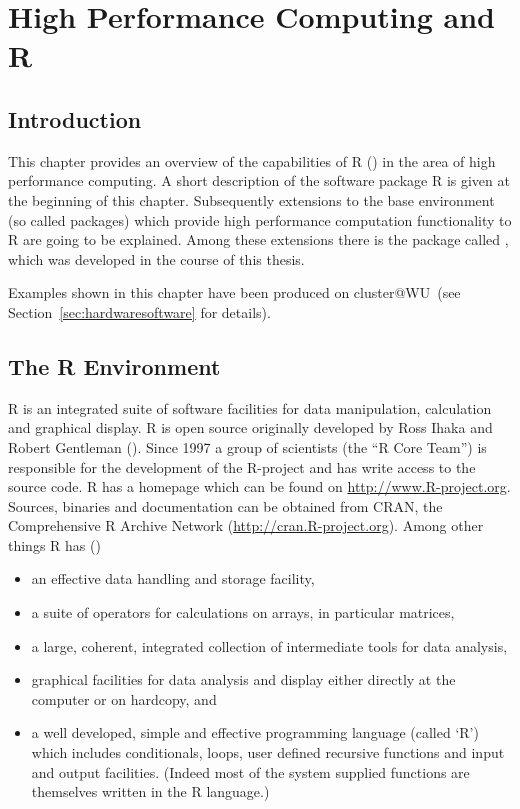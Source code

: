 \chapter{High Performance Computing and R}
\label{chap:Rhpc}
\section{Introduction}

This chapter provides an overview of the capabilities of R
(\cite{Rcore07R}) in the area 
of high performance computing. A short description of the
software package R is given at the beginning of this
chapter. Subsequently extensions to the base environment 
(so called packages) which provide high performance computation
functionality to 
R are going to be explained. Among these extensions there is the
package called , which was developed in the course of
this thesis.

Examples shown in this chapter have been produced on cluster@WU~(see
Section~\ref{sec:hardwaresoftware} for details).  

\section{The R Environment}

R is an integrated suite of software facilities for data manipulation,
calculation and graphical display. R is open source originally
developed by Ross Ihaka and Robert Gentleman
(\cite{ihaka96rld}). Since 1997 a group of scientists (the
``R Core Team'') is responsible for the development of the R-project
and has write access to the source code. R has a homepage
which can be found on \url{http://www.R-project.org}. Sources, binaries
and documentation can be obtained from CRAN, the Comprehensive R
Archive Network (\url{http://cran.R-project.org}). Among other things
R has (\cite{Rcore07R}) 
\begin{itemize}
\item an effective data handling and storage facility,
\item a suite of operators for calculations on arrays, in particular matrices,
\item a large, coherent, integrated collection of intermediate tools
  for data analysis,
\item graphical facilities for data analysis and display either
  directly at the computer or on hardcopy, and
\item a well developed, simple and effective programming language
  (called `R') which includes conditionals, loops, user defined
  recursive functions and input and output facilities. (Indeed most of
  the system supplied functions are themselves written in the R
  language.)
\end{itemize}

